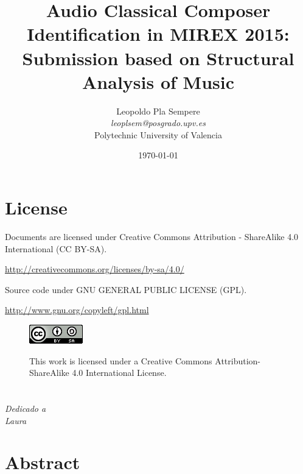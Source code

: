 \documentclass[a4paper,openany,oneside,12pt]{book}
\begin{document}
\title{Audio Classical Composer Identification in MIREX 2015: Submission based on Structural Analysis of Music}
\author{
        Leopoldo Pla Sempere\\
        {\it leoplsem@posgrado.upv.es}\\
        Polytechnic University of Valencia\\
}

\date{\today}
\maketitle

\newpage
\mbox{}
\thispagestyle{empty} %



\chapter*{License}
Documents are licensed under Creative Commons Attribution - ShareAlike 4.0 International (CC BY-SA).

\url{http://creativecommons.org/licenses/by-sa/4.0/}



Source code under GNU GENERAL PUBLIC LICENSE (GPL).

\url{http://www.gnu.org/copyleft/gpl.html}



\begin{figure}
\centering
\includegraphics{img/cc.png} 

This work is licensed under a Creative Commons Attribution-ShareAlike 4.0 International License.
\end{figure}

\chapter*{}
\begin{flushright}
\textit{Dedicado a \\
Laura}
\end{flushright}


\chapter*{Abstract}
\end{document}
